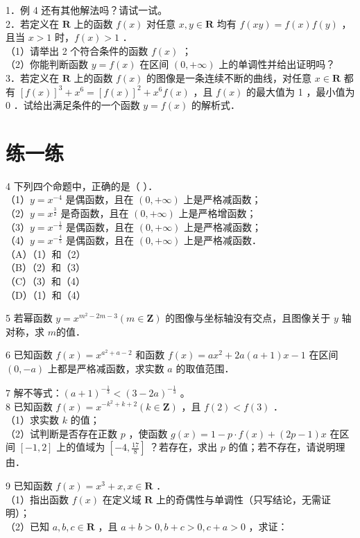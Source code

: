 \documentclass[10pt]{article}
\begin{document}
1．例 4 还有其他解法吗？请试一试。\\
2．若定义在 \(\mathbf{R}\) 上的函数 \(f(x)\) 对任意 \(x, y \in \mathbf{R}\) 均有 \(f(x y)=f(x) f(y)\) ，且当 \(x>1\) 时，\(f(x)>1\) ．\\
（1）请举出 2 个符合条件的函数 \(f(x)\) ；\\
（2）你能判断函数 \(y=f(x)\) 在区间 \((0,+\infty)\) 上的单调性并给出证明吗？\\
3．若定义在 \(\mathbf{R}\) 上的函数 \(f(x)\) 的图像是一条连续不断的曲线，对任意 \(x \in \boldsymbol{R}\) 都有 \([f(x)]^{3}+x^{6}=[f(x)]^{2}+x^{6} f(x)\) ，且 \(f(x)\) 的最大值为 1 ，最小值为 0 ．试给出满足条件的一个函数 \(y=f(x)\) 的解析式．

\section*{练一练}
4 下列四个命题中，正确的是（ ）．\\
（1）\(y=x^{-4}\) 是偶函数，且在 \((0,+\infty)\) 上是严格减函数；\\
（2）\(y=x^{\frac{3}{2}}\) 是奇函数，且在 \((0,+\infty)\) 上是严格增函数；\\
（3）\(y=x^{-\frac{1}{2}}\) 是偶函数，且在 \((0,+\infty)\) 上是严格减函数；\\
（4）\(y=x^{-\frac{4}{5}}\) 是偶函数，且在 \((0,+\infty)\) 上是严格减函数．\\
（A）（1）和（2）\\
（B）（2）和（3）\\
（C）（3）和（4）\\
（D）（1）和（4）

5 若幂函数 \(y=x^{m^{2}-2 m-3}(m \in \mathbf{Z})\) 的图像与坐标轴没有交点，且图像关于 \(y\) 轴对称，求 \(m\)的值．

6 已知函数 \(f(x)=x^{a^{2}+a-2}\) 和函数 \(f(x)=a x^{2}+2 a(a+1) x-1\) 在区间 \((0,-a)\) 上都是严格减函数，求实数 \(a\) 的取值范围．

7 解不等式：\((a+1)^{-\frac{1}{3}}<(3-2 a)^{-\frac{1}{3}}\) 。\\
8 已知函数 \(f(x)=x^{-k^{2}+k+2}(k \in \mathbf{Z})\) ，且 \(f(2)<f(3)\) ．\\
（1）求实数 \(k\) 的值；\\
（2）试判断是否存在正数 \(p\) ，使函数 \(g(x)=1-p \cdot f(x)+(2 p-1) x\) 在区间 \([-1,2]\) 上的值域为 \(\left[-4, \frac{17}{8}\right]\) ？若存在，求出 \(p\) 的值；若不存在，请说明理由．

9 已知函数 \(f(x)=x^{3}+x, x \in \mathbf{R}\) ．\\
（1）指出函数 \(f(x)\) 在定义域 \(\mathbf{R}\) 上的奇偶性与单调性（只写结论，无需证明）；\\
（2）已知 \(a, b, c \in \mathbf{R}\) ，且 \(a+b>0, b+c>0, c+a>0\) ，求证：
\end{document}
